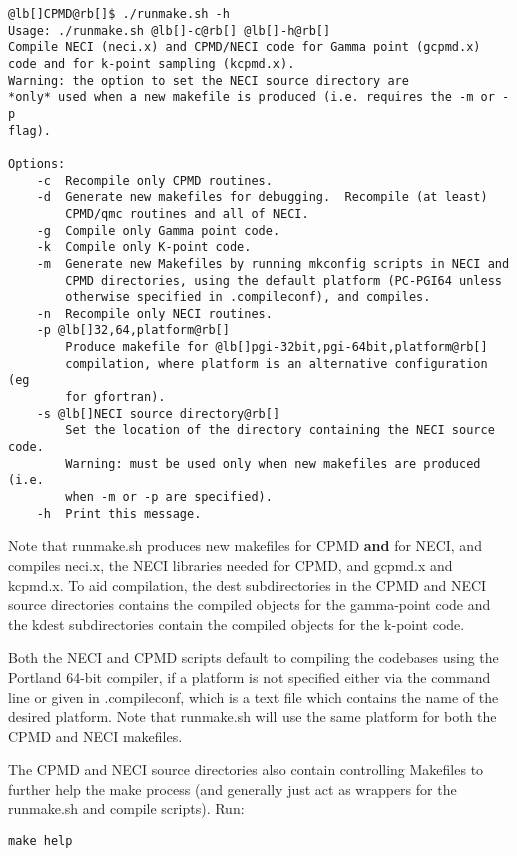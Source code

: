 \documentclass[openany,a4paper,10pt]{manual}
\begin{document}
\begin{Verbatim}[commandchars=@\[\]]
@lb[]CPMD@rb[]$ ./runmake.sh -h
Usage: ./runmake.sh @lb[]-c@rb[] @lb[]-h@rb[]
Compile NECI (neci.x) and CPMD/NECI code for Gamma point (gcpmd.x)
code and for k-point sampling (kcpmd.x).
Warning: the option to set the NECI source directory are
*only* used when a new makefile is produced (i.e. requires the -m or -p
flag).

Options:
    -c  Recompile only CPMD routines.
    -d  Generate new makefiles for debugging.  Recompile (at least)
        CPMD/qmc routines and all of NECI.
    -g  Compile only Gamma point code.
    -k  Compile only K-point code.
    -m  Generate new Makefiles by running mkconfig scripts in NECI and
        CPMD directories, using the default platform (PC-PGI64 unless
        otherwise specified in .compileconf), and compiles.
    -n  Recompile only NECI routines.
    -p @lb[]32,64,platform@rb[]
        Produce makefile for @lb[]pgi-32bit,pgi-64bit,platform@rb[]
        compilation, where platform is an alternative configuration (eg
        for gfortran).
    -s @lb[]NECI source directory@rb[]
        Set the location of the directory containing the NECI source code.
        Warning: must be used only when new makefiles are produced (i.e.
        when -m or -p are specified).
    -h  Print this message.
\end{Verbatim}

Note that runmake.sh produces new makefiles for CPMD \textbf{and} for NECI,
and compiles neci.x, the NECI libraries needed for CPMD, and gcpmd.x
and kcpmd.x.  To aid compilation, the dest subdirectories in the CPMD and
NECI source directories contains the compiled objects for the gamma-point
code and the kdest subdirectories contain the compiled objects for the
k-point code.

Both the NECI and CPMD scripts default to compiling the codebases using
the Portland 64-bit compiler, if a platform is not specified either via
the command line or given in .compileconf, which is a text file which
contains the name of the desired platform.  Note that runmake.sh will
use the same platform for both the CPMD and NECI makefiles.

The CPMD and NECI source directories also contain controlling Makefiles
to further help the make process (and generally just act as wrappers
for the runmake.sh and compile scripts).  Run:

\begin{Verbatim}[commandchars=@\[\]]
make help
\end{Verbatim}
\end{document}
